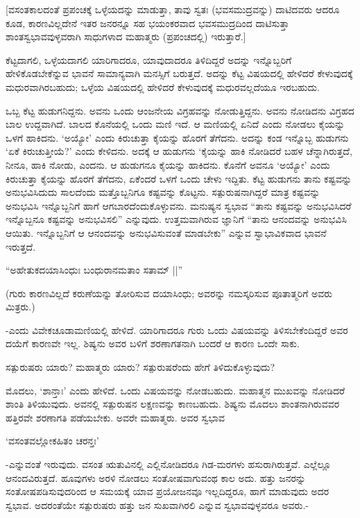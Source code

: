 [ವಸಂತಕಾಲದಂತೆ ಪ್ರಪಂಚಕ್ಕೆ ಒಳ್ಳೆಯದನ್ನು ಮಾಡುತ್ತಾ, ತಾವು ಸ್ವತಃ (ಭವಸಮುದ್ರವನ್ನು) ದಾಟಿದವರು ಆದರೂ ಕೂಡ, ಕಾರಣವಿಲ್ಲದೇನೆ ಇತರ ಜನರನ್ನೂ ಸಹ ಭಯಂಕರವಾದ ಭವಸಮುದ್ರದಿಂದ ದಾಟಿಸುತ್ತಾ  ಶಾಂತಸ್ವಭಾವವುಳ್ಳವರಾಗಿ ಸಾಧುಗಳಾದ ಮಹಾತ್ಮರು (ಪ್ರಪಂಚದಲ್ಲಿ) ಇರುತ್ತಾರೆ.]

ಕೆಟ್ಟದಾಗಲಿ, ಒಳ್ಳೆಯದಾಗಲಿ ಯಾರಿಗಾದರೂ, ಯಾವುದಾದರೂ ತಿಳಿದಿದ್ದರೆ ಅದನ್ನು ಇನ್ನೊಬ್ಬರಿಗೆ ಹೇಳಿಕೊಡಬೇಕೆನ್ನುವ ಭಾವನೆ ಸಾಮಾನ್ಯವಾಗಿ ಮನಸ್ಸಿಗೆ ಬರುತ್ತದೆ. ಅದನ್ನು ಕೆಟ್ಟ ವಿಷಯದಲ್ಲಿ ಹೇಳಿದರೆ ಕೇಳುವುದಕ್ಕೆ ಮಧುರವಾಗಿರಬಹುದು; ಒಳ್ಳೆಯ ವಿಷಯದಲ್ಲಿ ಹೇಳಿದರೆ ಕೇಳುವುದಕ್ಕೆ ಮಧುರವಲ್ಲದೆಯೂ ಇರಬಹುದು.

ಒಬ್ಬ ಕೆಟ್ಟ ಹುಡುಗನಿದ್ದನು. ಅವನು ಒಂದು ಆಂಜನೇಯ ವಿಗ್ರಹವನ್ನು ನೋಡುತ್ತಿದ್ದನು. ಅವನು ನೋಡಿದನು ವಿಗ್ರಹದ ಬಾಲ ಉದ್ದವಾಗಿದೆ. ಬಾಲದ ಕೊನೆಯಲ್ಲಿ ಒಂದು ಮಣಿ ಇದೆ. ಆ ಮಣಿಯಲ್ಲಿ ಏನಿದೆ ಎಂದು ನೋಡಲು ಕೈಯನ್ನು ಒಳಗೆ  ಹಾಕಿದನು. `ಅಯ್ಯೋ' ಎಂದು ಕಿರುಚುತ್ತಾ ಕೈಯನ್ನು ಹೊರಗೆ ತೆಗೆದನು. ಅದನ್ನು ಕಂಡ ಇನ್ನೊಬ್ಬ ಹುಡುಗನು `ಏಕೆ ಕಿರುಚುತ್ತೀಯೆ?' ಎಂದು ಕೇಳಿದನು. ಅದಕ್ಕೆ ಆ ಹುಡುಗನು `ಕೈಯನ್ನು ಹಾಕಿ ನೋಡಿದರೆ ಬಹಳ ಚೆನ್ನಾಗಿರುತ್ತದೆ, ನೀನೂ, ಹಾಕಿ ನೋಡು, ಎಂದನು. ಆ ಹುಡುಗನೂ ಕೈಯನ್ನು ಹಾಕಿದನು. ಕೊನೆಗೆ ಅವನೂ `ಅಯ್ಯೋ' ಎಂದು ಕಿರುಚುತ್ತಾ ಕೈಯನ್ನು ಹೊರಗೆ ತೆಗೆದನು, ಏಕೆಂದರೆ ಒಳಗೆ ಒಂದು ಚೇಳು ಇದ್ದಿತು. ಕೆಟ್ಟ ಹುಡುಗನು ತಾನು ಕಷ್ಟವನ್ನು ಅನುಭವಿಸಿದುದು ಸಾಲದೆಂದು ಮತ್ತೊಬ್ಬನಿಗೂ ಕಷ್ಟವನ್ನು ಕೊಟ್ಟನು. ಸತ್ಪುರುಷನಾಗಿದ್ದರೆ ಮಾತ್ರ ಕಷ್ಟವನ್ನು ಅನುಭವಿಸಿ ಇನ್ನೊಬ್ಬನಿಗೆ ಹಾಗೆ ಆಗಬಾರದೆಂದುಕೊಳ್ಳುವನು. ಮನುಷ್ಯನ ಸ್ವಭಾವ ``ತಾನು ಕಷ್ಟವನ್ನು ಅನುಭವಿಸಿದರೆ ಇನ್ನೊಬ್ಬನೂ ಕಷ್ಟವನ್ನು ಅನುಭವಿಸಲಿ'' ಎನ್ನುವುದು. ಉತ್ತಮವಾಗಿರುವ ಜ್ಞಾನಿಗೆ ``ತಾನು ಆನಂದವನ್ನು ಅನುಭವಿಸಿ ಆಯಿತು. ಇನ್ನೊಬ್ಬನಿಗೆ ಆ ಆನಂದವನ್ನು ಅನುಭವಿಸುವಂತೆ ಮಾಡಬೇಕು'' ಎನ್ನುವ ಸ್ವಾಭಾವಿಕವಾದ ಭಾವನೆ ಇರುತ್ತದೆ. 

\begin{shloka}
``ಅಹೇತುಕದಯಾಸಿಂಧುಃ ಬಂಧುರಾನಮತಾಂ ಸತಾಮ್ ||''
\end{shloka}

(ಗುರು ಕಾರಣವಿಲ್ಲದೆ ಕರುಣೆಯನ್ನು ತೋರಿಸುವ ದಯಾಸಿಂಧು; ಅವರನ್ನು ನಮಸ್ಕರಿಸುವ ಪೂತಾತ್ಮರಿಗೆ ಅವರು ಮಿತ್ರರು.)

-ಎಂದು ವಿವೇಕಚೂಡಾಮಣಿಯಲ್ಲಿ ಹೇಳಿದೆ. ಯಾರಿಗಾದರೂ ಗುರು ಒಂದು ವಿಷಯವನ್ನು ತಿಳಿಸಬೇಕೆಂದಿದ್ದರೆ ಅವರ ದಯೆಗೆ ಕಾರಣವೇ ಇಲ್ಲ. ಶಿಷ್ಯನು ಅವರ ಬಳಿಗೆ ಶರಣಾಗತನಾಗಿ ಬಂದರೆ ಆ ಕಾರಣ ಒಂದೇ ಸಾಕು.

ಸತ್ಪುರುಷರು ಯಾರು? ಮಹಾತ್ಮರು ಯಾರು? ಸತ್ಪುರುಷರೆಂದು ಹೇಗೆ ತಿಳಿದುಕೊಳ್ಳುವುದು?

ಮೊದಲು, `ಶಾನ್ತಾಃ' ಎಂದು ಹೇಳಿದೆ. ಒಂದು ವಿಷಯವನ್ನು ನೋಡಬಹುದು. ಮಹಾತ್ಮನ ಮುಖವನ್ನು ನೋಡಿದರೆ ಶಾಂತಿ ತಿಳಿಯುವುದು. ಅವನಲ್ಲಿ ಸತ್ಪುರುಷನ ಲಕ್ಷಣವನ್ನು ಕಾಣಬಹುದು. ಶಿಷ್ಯನು ಮೊದಲು ಶಾಂತನಾಗಿರುವವರ ಹತ್ತಿರವೇ ಶರಣಾಗತಿ ಪಡೆಯಬೇಕು. ಅವರೇ ಮಹಾತ್ಮರು. ಅವರ ಸ್ವಭಾವ

\begin{shloka}
`ವಸಂತವಲ್ಲೋಕಹಿತಂ ಚರನ್ತಃ'
\end{shloka}

-ಎನ್ನುವಂತೆ ಇರುವುದು. ವಸಂತ ಋತುವಿನಲ್ಲಿ ಎಲ್ಲಿನೋಡಿದರೂ ಗಿಡ-ಮರಗಳು ಹಸುರಾಗಿರುತ್ತವೆ. ಎಲ್ಲೆಲ್ಲೂ ಆನಂದವಿರುತ್ತದೆ. ಹೂವುಗಳು ಅರಳಿ ನೋಡಲು ಸಂತೋಷವಾಗುವಂಥ ಕಾಲ ಅದು. ಹತ್ತು ಜನರನ್ನು ಸಂತೋಷಪಡಿಸುವುದರಿಂದ ಆ ಸಮಯಕ್ಕೆ ಯಾವ ಪ್ರಯೋಜನವೂ ಇಲ್ಲದಿದ್ದರೂ, ಹಾಗೆ ಮಾಡುವುದು ಅದರ ಸ್ವಭಾವ. ಅದರಂತೆಯೇ ಸತ್ಪುರುಷರು ಹತ್ತು ಜನ ಸುಖವಾಗಿರಲಿ ಎನ್ನುವ ಸ್ವಭಾವವುಳ್ಳವರೂ ಅವರು.-

